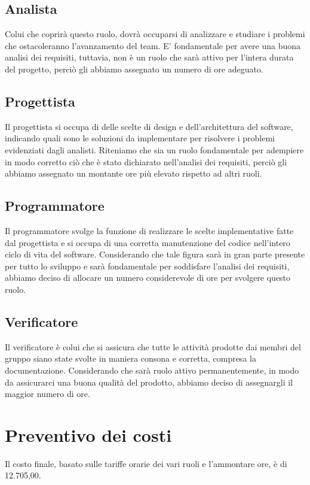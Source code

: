 \documentclass[12pt]{article}
\begin{document}
	
	\subsection{Analista}
	Colui che coprirà questo ruolo, dovrà occuparsi di analizzare e studiare i problemi che ostacoleranno l'avanzamento del team. E' fondamentale per avere una buona analisi dei requisiti, tuttavia, non è un ruolo che sarà attivo per l'intera durata del progetto, perciò gli abbiamo assegnato un numero di ore adeguato.
	
	\subsection{Progettista}
	Il progettista si occupa di delle scelte di design e dell'architettura del software, indicando quali sono le soluzioni da implementare per risolvere i problemi evidenziati dagli analisti. Riteniamo che sia un ruolo fondamentale per adempiere in modo corretto ciò che è stato dichiarato nell'analisi dei requisiti, perciò gli abbiamo assegnato un montante ore più elevato rispetto ad altri ruoli.
	
	
	\subsection{Programmatore}
	Il programmatore svolge la funzione di realizzare le scelte implementative fatte dal progettista e  si occupa di una corretta manutenzione del codice nell'intero ciclo di vita del software. Considerando che tale figura sarà  in gran parte presente per tutto lo sviluppo e sarà fondamentale per soddisfare l'analisi dei requisiti, abbiamo deciso di allocare un numero considerevole di ore per svolgere questo ruolo. 
	
	
	\subsection{Verificatore}
	Il verificatore è colui che si assicura che tutte le attività prodotte dai membri del gruppo siano state svolte in maniera consona e corretta, compresa la documentazione. Considerando che sarà ruolo attivo permanentemente, in modo da assicurarci una buona qualità del prodotto, abbiamo deciso di assegnargli il maggior numero di ore.
	
	\section{Preventivo dei costi}
	Il costo finale, basato sulle tariffe orarie dei vari ruoli e l'ammontare ore, è di 12.705,00\texteuro.
	
\end{document}

